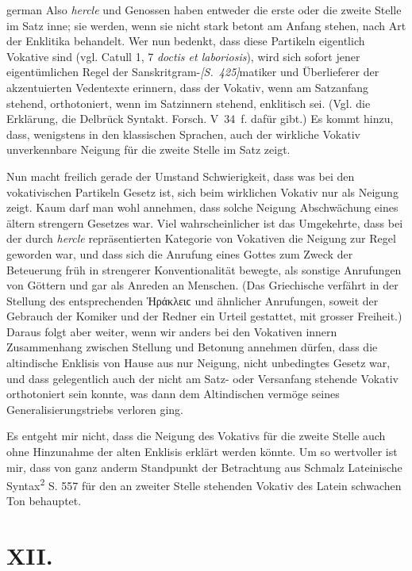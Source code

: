 \begin{otherlanguage*}{german}
Also \emph{hercle} und Genossen haben entweder die erste oder die zweite Stelle im Satz inne; sie werden, wenn sie nicht stark betont am Anfang stehen, nach Art der Enklitika behandelt. Wer nun bedenkt, dass diese Partikeln eigentlich Vokative sind (vgl. Catull 1, 7 \emph{doctis  et laboriosis}), wird sich sofort jener eigentümlichen Regel der Sanskritgram-\hypertarget{p425}{\emph{[S.~425]}}\label{p425}matiker und Überlieferer der akzentuierten Vedentexte erinnern, dass der Vokativ, wenn am Satzanfang stehend, orthotoniert, wenn im Satzinnern stehend, enklitisch sei. (Vgl. die Erklärung, die Delbrück Syntakt. Forsch. V~34~f. dafür gibt.) Es kommt hinzu, dass, wenigstens in den klassischen Sprachen, auch der wirkliche Vokativ unverkennbare Neigung für die zweite Stelle im Satz zeigt.

Nun macht freilich gerade der Umstand Schwierigkeit, dass was bei den vokativischen Partikeln Gesetz ist, sich beim wirklichen Vokativ nur als Neigung zeigt. Kaum darf man wohl annehmen, dass solche Neigung Abschwächung eines ältern strengern Gesetzes war. Viel wahrscheinlicher ist das Umgekehrte, dass bei der durch \emph{hercle} repräsentierten Kategorie von Vokativen die Neigung zur Regel geworden war, und dass sich die Anrufung eines Gottes zum Zweck der Beteuerung früh in strengerer Konventionalität bewegte, als sonstige Anrufungen von Göttern und gar als Anreden an Menschen. (Das Griechische verfährt in der Stellung des entsprechenden Ἡράκλειϲ und ähnlicher Anrufungen, soweit der Gebrauch der Komiker und der Redner ein Urteil gestattet, mit gros\-ser Freiheit.) Daraus folgt aber weiter, wenn wir anders bei den Vokativen innern Zusammenhang zwischen Stellung und Betonung annehmen dürfen, dass die altindische Enklisis von Hause aus nur Neigung, nicht unbedingtes Gesetz war, und dass gelegentlich auch der nicht am Satz- oder Versanfang stehende Vokativ orthotoniert sein konnte, was dann dem Altindischen vermöge seines Generalisierungstriebs verloren ging.

Es entgeht mir nicht, dass die Neigung des Vokativs für die zweite Stelle auch ohne Hinzunahme der alten Enklisis erklärt werden könnte. Um so wertvoller ist mir, dass von ganz anderm Standpunkt der Betrachtung aus Schmalz Lateinische Syntax\textsuperscript{2} S. 557 für den an zweiter Stelle stehenden Vokativ des Latein schwachen Ton behauptet.

\section*{XII.}


\end{otherlanguage*}
